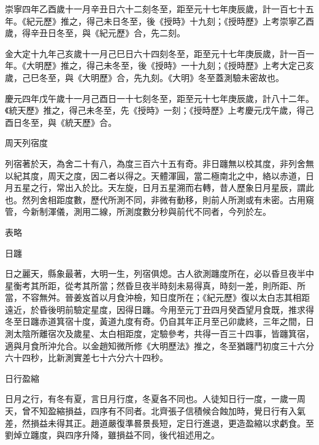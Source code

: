 \begin{pinyinscope}
 崇寧四年乙酉歲十一月辛丑日六十二刻冬至，距至元十七年庚辰歲，計一百七十五年。《紀元歷》推之，得己未日冬至，後《授時》十九刻；《授時歷》上考崇寧乙酉歲，得辛丑日冬至，與《紀元歷》合，先二刻。



 金大定十九年己亥歲十一月己巳日六十四刻冬至，距至元十七年庚辰歲，計一百一年。《大明歷》推之，得己未冬至，後《授時》一十九刻；《授時歷》上考大定己亥歲，己巳冬至，與《大明歷》合，先九刻。《大明》冬至蓋測驗未密故也。



 慶元四年戊午歲十一月己酉日一十七刻冬至，距至元十七年庚辰歲，計八十二年。《統天歷》推之，得己未冬至，先《授時》一刻；《授時歷》上考慶元戊午歲，得己酉日冬至，與《統天歷》合。



 周天列宿度



 列宿著於天，為舍二十有八，為度三百六十五有奇。非日躔無以校其度，非列舍無以紀其度，周天之度，因二者以得之。天體渾圓，當二極南北之中，絡以赤道，日月五星之行，常出入於比。天左旋，日月五星溯而右轉，昔人歷象日月星辰，謂此也。然列舍相距度數，歷代所測不同，非微有動移，則前人所測或有未密。古用窺管，今新制渾儀，測用二線，所測度數分秒與前代不同者，今列於左。



 表略



 日躔



 日之麗天，縣象最著，大明一生，列宿俱熄。古人欲測躔度所在，必以昏旦夜半中星衡考其所距，從考其所當；然昏旦夜半時刻未易得真，時刻一差，則所距、所當，不容無舛。晉姜岌首以月食沖檢，知日度所在；《紀元歷》復以太白志其相距遠近，於昏後明前驗定星度，因得日躔。今用至元丁丑四月癸酉望月食既，推求得冬至日躔赤道箕宿十度，黃道九度有奇。仍自其年正月至己卯歲終，三年之間，日測太陰所離宿次及歲星、太白相距度，定驗參考，共得一百三十四事，皆躔箕宿，適與月食所沖允合。以金趙知微所修《大明歷法》推之，冬至猶躔鬥初度三十六分六十四秒，比新測實差七十六分六十四秒。



 日行盈縮



 日月之行，有冬有夏，言日月行度，冬夏各不同也。人徒知日行一度，一歲一周天，曾不知盈縮損益，四序有不同者。北齊張子信積候合蝕加時，覺日行有入氣差，然損益未得其正。趙道嚴復準晷景長短，定日行進退，更造盈縮以求虧食。至劉焯立躔度，與四序升降，雖損益不同，後代祖述用之。




\end{pinyinscope}
